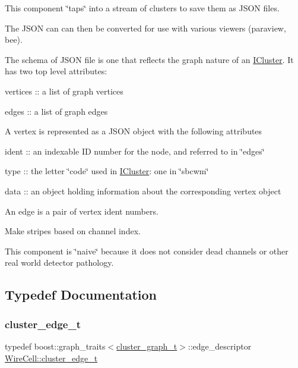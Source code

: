 This component \char`\"{}taps\char`\"{} into a stream of clusters to save them as J\+S\+ON files.

The J\+S\+ON can can then be converted for use with various viewers (paraview, bee).

The schema of J\+S\+ON file is one that reflects the graph nature of an \hyperlink{class_wire_cell_1_1_i_cluster}{I\+Cluster}. It has two top level attributes\+:


\begin{DoxyItemize}
\item vertices \+:\+: a list of graph vertices
\item edges \+:\+: a list of graph edges
\end{DoxyItemize}

A vertex is represented as a J\+S\+ON object with the following attributes
\begin{DoxyItemize}
\item ident \+:\+: an indexable ID number for the node, and referred to in \char`\"{}edges\char`\"{}
\item type \+:\+: the letter \char`\"{}code\char`\"{} used in \hyperlink{class_wire_cell_1_1_i_cluster}{I\+Cluster}\+: one in \char`\"{}sbcwm\char`\"{}
\item data \+:\+: an object holding information about the corresponding vertex object
\end{DoxyItemize}

An edge is a pair of vertex ident numbers.

Make stripes based on channel index.

This component is \char`\"{}naive\char`\"{} because it does not consider dead channels or other real world detector pathology. 

\subsection{Typedef Documentation}
\mbox{\label{namespace_wire_cell_ad8467b97f80d30874cc5356432daf6f2}} 
\subsubsection{\texorpdfstring{cluster\+\_\+edge\+\_\+t}{cluster\_edge\_t}}
{\footnotesize\ttfamily typedef boost\+::graph\+\_\+traits$<$\hyperlink{namespace_wire_cell_a6a9ecba14dfba50cdb081820a8bcacbe}{cluster\+\_\+graph\+\_\+t}$>$\+::edge\+\_\+descriptor \hyperlink{namespace_wire_cell_ad8467b97f80d30874cc5356432daf6f2}{Wire\+Cell\+::cluster\+\_\+edge\+\_\+t}}



